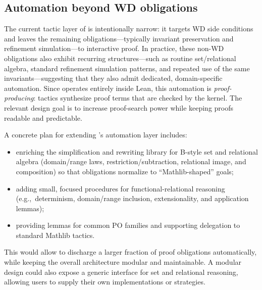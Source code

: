 
\subsection{Automation beyond WD obligations}\label{sec:future-auto}

The current tactic layer of \barrel is intentionally narrow: it targets WD side conditions and leaves the remaining obligations---typically invariant preservation and refinement simulation---to interactive proof.
In practice, these non-WD obligations also exhibit recurring structures---such as routine set/relational algebra, standard refinement simulation patterns, and repeated use of the same invariants---suggesting that they also admit dedicated, domain-specific automation.
Since \barrel operates entirely inside Lean, this automation is \emph{proof-producing}: tactics synthesize proof terms that are checked by the kernel.
The relevant design goal is to increase proof-search power while keeping proofs readable and predictable.

A concrete plan for extending \barrel's automation layer includes:
\begin{itemize}
	\item enriching the simplification and rewriting library for B-style set and relational algebra (domain/range laws, restriction/subtraction, relational image, and composition) so that obligations normalize to ``Mathlib-shaped'' goals;
	\item adding small, focused procedures for functional-relational reasoning (e.g.,\ determinism, domain/range inclusion, extensionality, and application lemmas);
	\item providing lemmas for common PO families and supporting delegation to standard Mathlib tactics.
\end{itemize}
This would allow \barrel to discharge a larger fraction of proof obligations automatically, while keeping the overall architecture modular and maintainable.
A modular design could also expose a generic interface for set and relational reasoning, allowing users to supply their own implementations or strategies.

